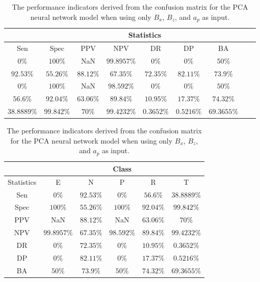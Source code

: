 \begin{table}[!ht]
	\centering
	\begin{tabular}{|c|c|c|c|c|c|c|c|c|}
		\hline
		 & \multicolumn{7}{c|}{Statistics} \\ \hline
		Sen & Spec & PPV & NPV & DR & DP & BA \\ \hline
		$0\%$ & $100\%$ & NaN & $99.8957\%$ & $0\%$ & $0\%$ & $50\%$ \\ \hline
		$92.53\%$ & $55.26\%$ & $88.12\%$ & $67.35\%$ & $72.35\%$ & $82.11\%$ & $73.9\%$ \\ \hline
		$0\%$ & $100\%$ & NaN & $98.592\%$ & $0\%$ & $0\%$ & $50\%$ \\ \hline
		$56.6\%$ & $92.04\%$ & $63.06\%$ & $89.84\%$ & $10.95\%$ & $17.37\%$ & $74.32\%$ \\ \hline
		$38.8889\%$ & $99.842\%$ & $70\%$ & $99.4232\%$ & $0.3652\%$ & $0.5216\%$ & $69.3655\%$ \\ \hline
	\end{tabular}
	\caption{The performance indicators derived from the confusion matrix for the PCA neural network model when using only $B_{x}$, $B_{z}$, and $a_{p}$ as input.}
	\label{tab:cs:xzap:pcaNNet}
\end{table}

\begin{table}[!ht]
	\centering
	\begin{tabular}{|c|c|c|c|c|c|}
		\hline
		 & \multicolumn{5}{c|}{Class} \\ \hline
		Statistics & E & N & P & R & T \\ \hline
		Sen & $0\%$ & $92.53\%$ & $0\%$ & $56.6\%$ & $38.8889\%$ \\ \hline
		Spec & $100\%$ & $55.26\%$ & $100\%$ & $92.04\%$ & $99.842\%$ \\ \hline
		PPV & NaN & $88.12\%$ & NaN & $63.06\%$ & $70\%$ \\ \hline
		NPV & $99.8957\%$ & $67.35\%$ & $98.592\%$ & $89.84\%$ & $99.4232\%$ \\ \hline
		DR & $0\%$ & $72.35\%$ & $0\%$ & $10.95\%$ & $0.3652\%$ \\ \hline
		DP & $0\%$ & $82.11\%$ & $0\%$ & $17.37\%$ & $0.5216\%$ \\ \hline
		BA & $50\%$ & $73.9\%$ & $50\%$ & $74.32\%$ & $69.3655\%$ \\ \hline
	\end{tabular}
	\caption{The performance indicators derived from the confusion matrix for the PCA neural network model when using only $B_{x}$, $B_{z}$, and $a_{p}$ as input.}
	\label{tab:cs:reverse:xzap:pcaNNet}
\end{table}

